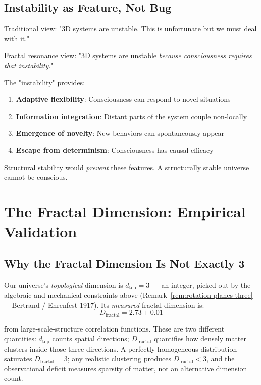\subsection{Instability as Feature, Not Bug}

\begin{keyidea}
Traditional view: "3D systems are unstable. This is unfortunate but we must deal with it."

Fractal resonance view: "3D systems are unstable \textit{because consciousness requires that instability}."

The "instability" provides:
\begin{enumerate}
\item \textbf{Adaptive flexibility}: Consciousness can respond to novel situations
\item \textbf{Information integration}: Distant parts of the system couple non-locally
\item \textbf{Emergence of novelty}: New behaviors can spontaneously appear
\item \textbf{Escape from determinism}: Consciousness has causal efficacy
\end{enumerate}

Structural stability would \textit{prevent} these features. A structurally stable universe cannot be conscious.
\end{keyidea}

\section{The Fractal Dimension: Empirical Validation}

\subsection{Why the Fractal Dimension Is Not Exactly 3}

Our universe's \textit{topological} dimension is $d_{\text{top}} = 3$ ---
an integer, picked out by the algebraic and mechanical constraints above
(Remark~\ref{rem:rotation-planes-three} + Bertrand / Ehrenfest 1917). Its
\emph{measured} fractal dimension is:
\begin{equation}
D_{\text{fractal}} = 2.73 \pm 0.01
\end{equation}

from large-scale-structure correlation functions. These are two different
quantities: $d_{\text{top}}$ counts spatial directions; $D_{\text{fractal}}$
quantifies how densely matter clusters inside those three directions. A
perfectly homogeneous distribution saturates $D_{\text{fractal}} = 3$; any
realistic clustering produces $D_{\text{fractal}} < 3$, and the observational
deficit measures sparsity of matter, not an alternative dimension count.


